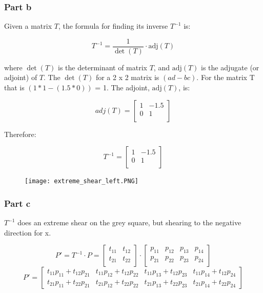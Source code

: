 \documentclass{article}
\begin{document}
\subsubsection*{Part b}

Given a matrix $T$, the formula for finding its inverse $T^{-1}$ is:

\begin{equation*}
T^{-1} = \frac{1}{\det(T)} \cdot \text{adj}(T)
\end{equation*}

where $\det(T)$ is the determinant of matrix $T$, and $\text{adj}(T)$ is the adjugate (or adjoint) of $T$.
The $\det(T)$ for a 2 x 2 matrix is $(ad-bc)$. For the matrix T that is $(1*1 - (1.5*0))$ = 1. 
The adjoint, $\text{adj}(T)$, is:

\[adj(T) = 
\begin{bmatrix}
    1 & -1.5  \\
    0 & 1  \\
\end{bmatrix}
\]

Therefore:

\[T^{-1} = 
\begin{bmatrix}
    1 & -1.5  \\
    0 & 1  \\
\end{bmatrix}
\]


\begin{figure}[H]
  \centering
  \texttt{[image: extreme\_shear\_left.PNG]}
  \label{fig3}
\end{figure}

\subsubsection*{Part c}

$T^{-1}$ does an extreme shear on the grey square, but shearing to the negative direction for x. 

\[ 
P' = T^{-1} \cdot P = \begin{bmatrix}
t_{11} & t_{12} \\
t_{21} & t_{22} \\
\end{bmatrix} \cdot \begin{bmatrix}
p_{11} & p_{12} & p_{13} & p_{14} \\
p_{21} & p_{22} & p_{23} & p_{24} \\
\end{bmatrix}
\]
\[P' =  
\begin{bmatrix}
    t_{11}p_{11} + t_{12}p_{21} & t_{11}p_{12} + t_{12}p_{22} & t_{11}p_{13} + t_{12}p_{23} & t_{11}p_{14} + t_{12}p_{24} \\
    t_{21}p_{11} + t_{22}p_{21} & t_{21}p_{12} + t_{22}p_{22} & t_{21}p_{13} + t_{22}p_{23} & t_{21}p_{14} + t_{22}p_{24}
\end{bmatrix}
\]
\end{document}
